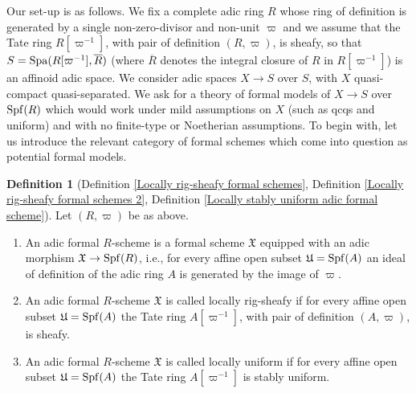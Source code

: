 \documentclass[12pt,twoside,a4paper]{article}
\theoremstyle{definition}
\newtheorem{mydef}[thm]{Definition}
\theoremstyle{remark}
\newcommand\Spa{{\rm Spa}}
\newcommand\Spf{{\rm Spf}}
\begin{document}
Our set-up is as follows. We fix a complete adic ring $R$ whose ring of definition is generated by a single non-zero-divisor and non-unit $\varpi$ and we assume that the Tate ring $R[\varpi^{-1}]$, with pair of definition $(R, \varpi)$, is sheafy, so that $S=\Spa(R[\varpi^{-1}], \overline{R})$ (where $\overline{R}$ denotes the integral closure of $R$ in $R[\varpi^{-1}]$) is an affinoid adic space. We consider adic spaces $X\to S$ over $S$, with $X$ quasi-compact quasi-separated. We ask for a theory of formal models of $X\to S$ over $\Spf(R)$ which would work under mild assumptions on $X$ (such as qcqs and uniform) and with no finite-type or Noetherian assumptions. To begin with, let us introduce the relevant category of formal schemes which come into question as potential formal models.
\begin{mydef}[Definition \ref{Locally rig-sheafy formal schemes}, Definition \ref{Locally rig-sheafy formal schemes 2}, Definition \ref{Locally stably uniform adic formal scheme}]Let $(R, \varpi)$ be as above. \begin{enumerate}[(1)]\item An adic formal $R$-scheme is a formal scheme $\mathfrak{X}$ equipped with an adic morphism $\mathfrak{X}\to\Spf(R)$, i.e., for every affine open subset $\mathfrak{U}=\Spf(A)$ an ideal of definition of the adic ring $A$ is generated by the image of $\varpi$. \item An adic formal $R$-scheme $\mathfrak{X}$ is called locally rig-sheafy if for every affine open subset $\mathfrak{U}=\Spf(A)$ the Tate ring $A[\varpi^{-1}]$, with pair of definition $(A, \varpi)$, is sheafy. \item An adic formal $R$-scheme $\mathfrak{X}$ is called locally uniform if for every affine open subset $\mathfrak{U}=\Spf(A)$ the Tate ring $A[\varpi^{-1}]$ is stably uniform. \end{enumerate}\end{mydef}
\end{document}
